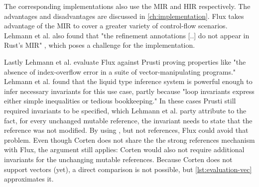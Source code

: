 The corresponding implementations also use the MIR and HIR respectively. The advantages and disadvantages are discussed in \cref{ch:implementation}. Flux takes advantage of the MIR to cover a greater variety of control-flow scenarios.
Lehmann et al. also found that "the refinement annotations [..] do not appear in Rust's MIR" \cite[p. 17]{lehmann_flux_2022}, which poses a challenge for the implementation.

Lastly Lehmann et al. evaluate Flux against Prusti proving properties like "the absence of index-overflow error in a suite of vector-manipulating programs." \cite[p. 2]{lehmann_flux_2022}
Lehmann et al. found that the liquid type inference system is powerful enough to infer necessary invariants for this use case, partly because "loop invariants express either simple inequalities or tedious bookkeeping." \cite[p. 21]{lehmann_flux_2022}
In these cases Prusti still required invariants to be specified, which Lehmann et al. party attribute to the fact, for every unchanged mutable reference, the invariant needs to state that the reference was not modified. By using , but not  references, Flux could avoid that problem.
Even though Corten does not share the the strong references mechanism with Flux, the argument still applies: Corten would also not require additional invariants for the unchanging mutable references.
Because Corten does not support vectors (yet), a direct comparison is not possible, but \cref{lst:evaluation-vec} approximates it.

